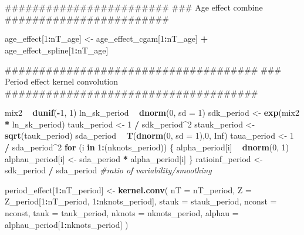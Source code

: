 \documentclass[11pt,]{article}
\newenvironment{Shaded}{\begin{snugshade}}{\end{snugshade}}
\newcommand{\KeywordTok}[1]{\textcolor[rgb]{0.13,0.29,0.53}{\textbf{#1}}}
\newcommand{\DataTypeTok}[1]{\textcolor[rgb]{0.13,0.29,0.53}{#1}}
\newcommand{\DecValTok}[1]{\textcolor[rgb]{0.00,0.00,0.81}{#1}}
\newcommand{\StringTok}[1]{\textcolor[rgb]{0.31,0.60,0.02}{#1}}
\newcommand{\CommentTok}[1]{\textcolor[rgb]{0.56,0.35,0.01}{\textit{#1}}}
\newcommand{\OtherTok}[1]{\textcolor[rgb]{0.56,0.35,0.01}{#1}}
\newcommand{\ControlFlowTok}[1]{\textcolor[rgb]{0.13,0.29,0.53}{\textbf{#1}}}
\newcommand{\OperatorTok}[1]{\textcolor[rgb]{0.81,0.36,0.00}{\textbf{#1}}}
\newcommand{\NormalTok}[1]{#1}
\begin{document}
\begin{Shaded}
\begin{Highlighting}[]
\NormalTok{  ########################}
\NormalTok{  ### Age effect combine}
\NormalTok{  ########################}

\NormalTok{  age_effect[}\DecValTok{1}\OperatorTok{:}\NormalTok{nT_age] <-}\StringTok{ }\NormalTok{age_effect_cgam[}\DecValTok{1}\OperatorTok{:}\NormalTok{nT_age] }\OperatorTok{+}\StringTok{ }\NormalTok{age_effect_spline[}\DecValTok{1}\OperatorTok{:}\NormalTok{nT_age]}

\NormalTok{  #####################################}
\NormalTok{  ### Period effect kernel convolution}
\NormalTok{  #####################################}

\NormalTok{  mix2 }\OperatorTok{~}\StringTok{ }\KeywordTok{dunif}\NormalTok{(}\OperatorTok{-}\DecValTok{1}\NormalTok{, }\DecValTok{1}\NormalTok{)}
\NormalTok{  ln_sk_period }\OperatorTok{~}\StringTok{ }\KeywordTok{dnorm}\NormalTok{(}\DecValTok{0}\NormalTok{, }\DataTypeTok{sd =} \DecValTok{1}\NormalTok{)}
\NormalTok{  sdk_period <-}\StringTok{ }\KeywordTok{exp}\NormalTok{(mix2 }\OperatorTok{*}\StringTok{ }\NormalTok{ln_sk_period)}
\NormalTok{  tauk_period <-}\StringTok{ }\DecValTok{1} \OperatorTok{/}\StringTok{ }\NormalTok{sdk_period}\OperatorTok{^}\DecValTok{2}
\NormalTok{  stauk_period <-}\StringTok{ }\KeywordTok{sqrt}\NormalTok{(tauk_period)}
\NormalTok{  sda_period }\OperatorTok{~}\StringTok{ }\KeywordTok{T}\NormalTok{(}\KeywordTok{dnorm}\NormalTok{(}\DecValTok{0}\NormalTok{, }\DataTypeTok{sd =} \DecValTok{1}\NormalTok{),}\DecValTok{0}\NormalTok{, }\OtherTok{Inf}\NormalTok{)}
\NormalTok{  taua_period <-}\StringTok{ }\DecValTok{1} \OperatorTok{/}\StringTok{ }\NormalTok{sda_period}\OperatorTok{^}\DecValTok{2}
  \ControlFlowTok{for}\NormalTok{ (i }\ControlFlowTok{in} \DecValTok{1}\OperatorTok{:}\NormalTok{(nknots_period)) \{}
\NormalTok{    alpha_period[i] }\OperatorTok{~}\StringTok{ }\KeywordTok{dnorm}\NormalTok{(}\DecValTok{0}\NormalTok{, }\DecValTok{1}\NormalTok{)}
\NormalTok{    alphau_period[i] <-}\StringTok{ }\NormalTok{sda_period }\OperatorTok{*}\StringTok{ }\NormalTok{alpha_period[i]}
\NormalTok{  \}}
\NormalTok{  ratioinf_period <-}\StringTok{ }\NormalTok{sdk_period }\OperatorTok{/}\StringTok{ }\NormalTok{sda_period }\CommentTok{#ratio of variability/smoothing}

\NormalTok{  period_effect[}\DecValTok{1}\OperatorTok{:}\NormalTok{nT_period] <-}\StringTok{ }\KeywordTok{kernel.conv}\NormalTok{(}
    \DataTypeTok{nT =}\NormalTok{ nT_period,}
    \DataTypeTok{Z =}\NormalTok{ Z_period[}\DecValTok{1}\OperatorTok{:}\NormalTok{nT_period, }\DecValTok{1}\OperatorTok{:}\NormalTok{nknots_period],}
    \DataTypeTok{stauk =}\NormalTok{ stauk_period,}
    \DataTypeTok{nconst =}\NormalTok{ nconst,}
    \DataTypeTok{tauk =}\NormalTok{ tauk_period,}
    \DataTypeTok{nknots =}\NormalTok{ nknots_period,}
    \DataTypeTok{alphau =}\NormalTok{ alphau_period[}\DecValTok{1}\OperatorTok{:}\NormalTok{nknots_period]}
\NormalTok{  )}


\end{Highlighting}
\end{Shaded}
\end{document}
